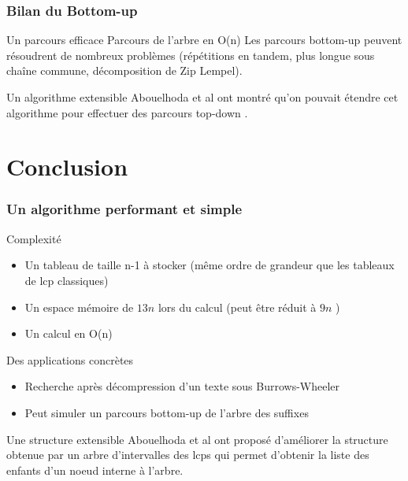 \documentclass[10pt]{beamer}
\begin{document}
\begin{frame}
  \frametitle{Bilan du Bottom-up}

  \begin{block}{Un parcours efficace}
    Parcours de l'arbre en O(n)
    Les parcours bottom-up peuvent résoudrent de nombreux problèmes
    (répétitions en tandem, plus longue sous chaîne commune,
    décomposition de Zip Lempel).
  \end{block}

  \begin{block}{Un algorithme extensible}
    Abouelhoda et al ont montré qu'on pouvait étendre cet algorithme
    pour effectuer des parcours top-down \cite{Abouelhoda200453}.
  \end{block}

\end{frame}



\section{Conclusion}
\label{sec:conclusion}

\begin{frame}
  \frametitle{Un algorithme performant et simple}

  \begin{block}{Complexité}
    \begin{itemize}
    \item Un tableau de taille n-1 à stocker (même ordre de grandeur que les
      tableaux de lcp classiques)
    \item Un espace mémoire de $13n $ lors du calcul (peut être réduit à $9n$ \cite{Manzini04})
    \item Un calcul en O(n)
    \end{itemize}
  \end{block}

  \pause

  \begin{block}{Des applications concrètes}
    \begin{itemize}
    \item Recherche après décompression d'un texte sous Burrows-Wheeler
    \item Peut simuler un parcours bottom-up de l'arbre des suffixes
    \end{itemize}
  \end{block}

  \pause

  \begin{block}{Une structure extensible}
    Abouelhoda et al\cite{Abouelhoda200453} ont proposé d'améliorer la structure obtenue par
    un arbre d'intervalles des lcps qui permet d'obtenir la liste des
    enfants d'un noeud interne à l'arbre.
  \end{block}

\end{frame}
\end{document}

